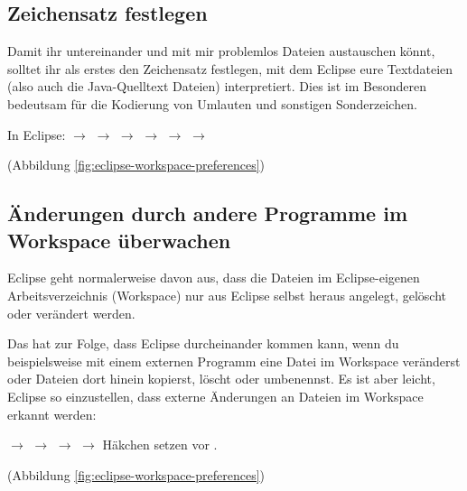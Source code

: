 \subsection{Zeichensatz festlegen}

Damit ihr untereinander und mit mir problemlos Dateien austauschen könnt,
solltet ihr als erstes den Zeichensatz festlegen, mit dem Eclipse eure
Textdateien (also auch die Java-Quelltext Dateien) interpretiert. Dies ist im
Besonderen bedeutsam für die Kodierung von Umlauten und sonstigen
Sonderzeichen.

In Eclipse:  $\rightarrow$  $\rightarrow$
 $\rightarrow$  $\rightarrow$  $\rightarrow$  $\rightarrow$ 

(Abbildung \ref{fig:eclipse-workspace-preferences}) 

\subsection{Änderungen durch andere Programme im Workspace überwachen}

Eclipse geht normalerweise davon aus, dass die Dateien im Eclipse-eigenen
Arbeitsverzeichnis (Workspace) nur aus Eclipse selbst heraus angelegt, gelöscht
oder verändert werden.

Das hat zur Folge, dass Eclipse durcheinander kommen kann, wenn du
beispielsweise mit einem externen Programm eine Datei im Workspace veränderst
oder Dateien dort hinein kopierst, löscht oder umbenennst.
Es ist aber leicht, Eclipse so einzustellen, dass externe Änderungen an Dateien
im Workspace erkannt werden:

 $\rightarrow$  $\rightarrow$
 $\rightarrow$  $\rightarrow$
Häkchen setzen vor .

(Abbildung \ref{fig:eclipse-workspace-preferences}) 

